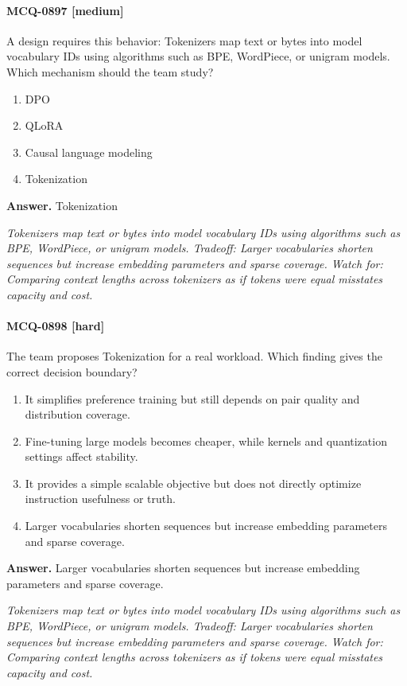 \paragraph{MCQ-0897 [medium]} A design requires this behavior: Tokenizers map text or bytes into model vocabulary IDs using algorithms such as BPE, WordPiece, or unigram models. Which mechanism should the team study?
\begin{enumerate}[label=\Alph*.]
\item DPO
\item QLoRA
\item Causal language modeling
\item Tokenization
\end{enumerate}
\noindent\textbf{Answer.} Tokenization
\par\textit{Tokenizers map text or bytes into model vocabulary IDs using algorithms such as BPE, WordPiece, or unigram models. Tradeoff: Larger vocabularies shorten sequences but increase embedding parameters and sparse coverage. Watch for: Comparing context lengths across tokenizers as if tokens were equal misstates capacity and cost.}
\paragraph{MCQ-0898 [hard]} The team proposes Tokenization for a real workload. Which finding gives the correct decision boundary?
\begin{enumerate}[label=\Alph*.]
\item It simplifies preference training but still depends on pair quality and distribution coverage.
\item Fine-tuning large models becomes cheaper, while kernels and quantization settings affect stability.
\item It provides a simple scalable objective but does not directly optimize instruction usefulness or truth.
\item Larger vocabularies shorten sequences but increase embedding parameters and sparse coverage.
\end{enumerate}
\noindent\textbf{Answer.} Larger vocabularies shorten sequences but increase embedding parameters and sparse coverage.
\par\textit{Tokenizers map text or bytes into model vocabulary IDs using algorithms such as BPE, WordPiece, or unigram models. Tradeoff: Larger vocabularies shorten sequences but increase embedding parameters and sparse coverage. Watch for: Comparing context lengths across tokenizers as if tokens were equal misstates capacity and cost.}
